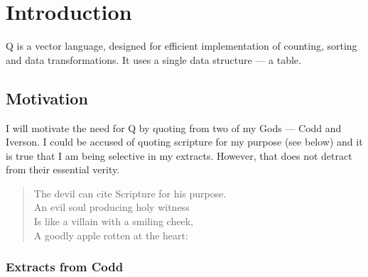 
\newcommand{\YES}{\checkmark}
\newcommand{\KW}{\bf{KW}\!:\!}
\newcommand{\Range}{{\cal{I}}}
\newcommand{\Args}{\({\cal{A}}\)}
\newcommand{\Pragmas}{{\cal{P}}}
\newcommand{\Multiple}{{\cal{F}}}
\newcommand{\cfld}{{\sf{b}}}
\newcommand{\NumericTypes}{\(\{I1, I2, I4, I8, F4, F8\}\)}
\newcommand{\IntegerTypes}{\(\{I1, I2, I4, I8\}\)}
\newcommand{\RealTypes}{\(\{F4, F8\}\)}

\section{Introduction}

Q is a vector language, designed for efficient implementation
of counting, sorting and data transformations. It uses a single data
structure --- a table.

\subsection{Motivation}

I will motivate the need for Q by quoting from two of my Gods --- Codd and
Iverson. I could be accused of quoting scripture for my purpose (see
below) and it is true that I am being selective in my extracts.
However, that does not detract from their essential verity.

\begin{verse}
The devil can cite Scripture for his purpose. \\ 
An evil soul producing holy witness \\ 
Is like a villain with a smiling cheek, \\
A goodly apple rotten at the heart:
\end{verse}

\subsubsection{Extracts from Codd}

